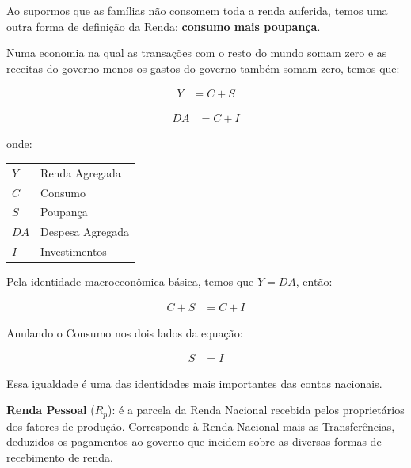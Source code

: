 \documentclass{article}\usepackage[]{graphicx}\usepackage[]{xcolor}
\makeatletter
\newenvironment{conditions}
  {\par\vspace{\abovedisplayskip}\noindent\begin{tabular}{>{$}l<{$} @{${}={}$} l}}
  {\end{tabular}\par\vspace{\belowdisplayskip}}
\makeatother
\begin{document}
Ao supormos que as famílias não consomem toda a renda auferida, temos uma outra forma de definição da Renda:
\textbf{consumo mais poupança}.\par

Numa economia na qual as transações com o resto do mundo somam zero e as receitas do governo menos os gastos do governo
também somam zero, temos que:


\begin{equation}\label{eq2}
\begin{split}
    Y   &=    C + S
\end{split}
\end{equation}

\begin{equation}\label{eq3}
\begin{split}
    DA  &=    C + I
\end{split}
\end{equation}

onde:

\begin{conditions}
Y   &   Renda Agregada\\
C   &   Consumo\\
S   &   Poupança\\
DA  &   Despesa Agregada\\
I   &   Investimentos
\end{conditions}

Pela identidade macroeconômica básica, temos que \(Y = DA\), então:

\begin{equation}\label{eq4}
\begin{split}
C + S &= C + I
\end{split}
\end{equation}

Anulando o Consumo nos dois lados da equação:

\begin{equation}\label{eq5}
\begin{split}
S &= I
\end{split}
\end{equation}

Essa igualdade é uma das identidades mais importantes das contas nacionais.\par

\textbf{Renda Pessoal} (\(R_p\)): é a parcela da Renda Nacional recebida pelos proprietários dos fatores de produção.
Corresponde à Renda Nacional mais as Transferências, deduzidos os pagamentos ao governo que incidem sobre as
diversas formas de recebimento de renda.
\end{document}

